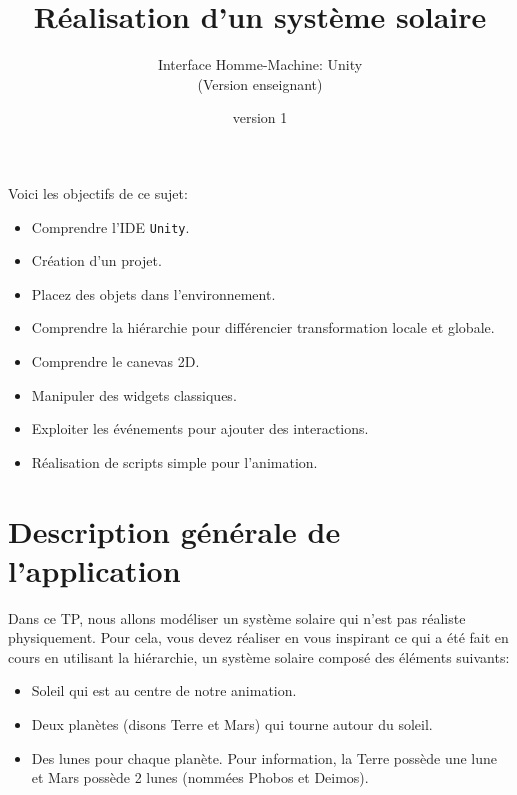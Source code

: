\documentclass[a4paper,10pt]{article}
\newenvironment{attention}%
{\begin{tcolorbox}[breakable,colback=green!25!white,colframe=red!55!black,title=Attention]}%
{\end{tcolorbox}}
\begin{document}
	


\title{\vspace*{-1cm}Réalisation d'un système solaire}
\author{\vspace*{-1.5cm}Interface Homme-Machine: Unity
\begin{ensnote}
	(Version enseignant)
\end{ensnote}
}
\date{\vspace*{-1.5cm}version 1}
\maketitle
\thispagestyle{fancy}

Voici les objectifs de ce sujet:
\begin{itemize}
	\item Comprendre l'IDE \texttt{Unity}.
	\item Création d'un projet.
	\item Placez des objets dans l'environnement.
	\item Comprendre la hiérarchie pour différencier transformation locale et globale.
	\item Comprendre le canevas 2D.
	\item Manipuler des widgets classiques.
	\item Exploiter les événements pour ajouter des interactions.
	\item Réalisation de scripts simple pour l'animation.
\end{itemize}


%	

\section*{Description générale de l'application}

Dans ce TP, nous allons modéliser un système solaire qui n'est pas réaliste physiquement. Pour cela, vous devez réaliser en vous inspirant ce qui a été fait en cours en utilisant la hiérarchie, un système solaire composé des éléments suivants:
\begin{itemize}
	\item Soleil qui est au centre de notre animation.
	\item Deux planètes (disons Terre et Mars) qui tourne autour du soleil.
	\item Des lunes pour chaque planète. Pour information, la Terre possède une lune et Mars possède 2 lunes (nommées Phobos et Deimos). 
\end{itemize}
\end{document}

